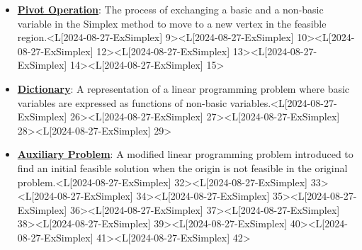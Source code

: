 \documentclass{article}%
\begin{document}
\begin{itemize}[[leftmargin=*]]
\item \href{https://www.math.purdue.edu/~yipn/421/2024-08-27-ExSimplex.pdf#page=9}{\textbf{Pivot Operation}}: The process of exchanging a basic and a non-basic variable in the Simplex method to move to a new vertex in the feasible region.<L[2024-08-27-ExSimplex] 9><L[2024-08-27-ExSimplex] 10><L[2024-08-27-ExSimplex] 12><L[2024-08-27-ExSimplex] 13><L[2024-08-27-ExSimplex] 14><L[2024-08-27-ExSimplex] 15>%
\item \href{https://www.math.purdue.edu/~yipn/421/2024-08-27-ExSimplex.pdf#page=26}{\textbf{Dictionary}}: A representation of a linear programming problem where basic variables are expressed as functions of non-basic variables.<L[2024-08-27-ExSimplex] 26><L[2024-08-27-ExSimplex] 27><L[2024-08-27-ExSimplex] 28><L[2024-08-27-ExSimplex] 29>%
\item \href{https://www.math.purdue.edu/~yipn/421/2024-08-27-ExSimplex.pdf#page=32}{\textbf{Auxiliary Problem}}: A modified linear programming problem introduced to find an initial feasible solution when the origin is not feasible in the original problem.<L[2024-08-27-ExSimplex] 32><L[2024-08-27-ExSimplex] 33><L[2024-08-27-ExSimplex] 34><L[2024-08-27-ExSimplex] 35><L[2024-08-27-ExSimplex] 36><L[2024-08-27-ExSimplex] 37><L[2024-08-27-ExSimplex] 38><L[2024-08-27-ExSimplex] 39><L[2024-08-27-ExSimplex] 40><L[2024-08-27-ExSimplex] 41><L[2024-08-27-ExSimplex] 42>%
\end{itemize}%
\end{document}
